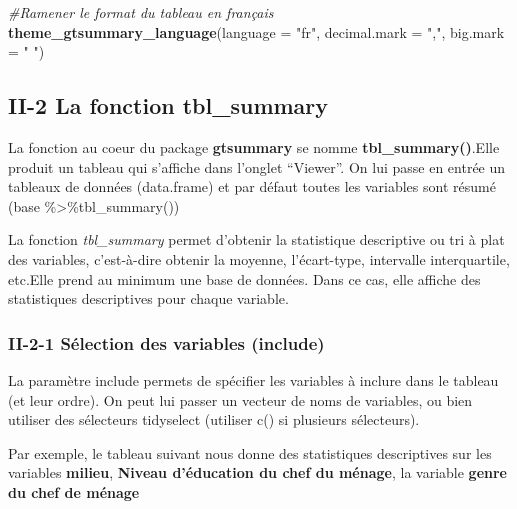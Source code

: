 \documentclass[
]{article}
\newenvironment{Shaded}{\begin{snugshade}}{\end{snugshade}}
\newcommand{\AttributeTok}[1]{\textcolor[rgb]{0.13,0.29,0.53}{#1}}
\newcommand{\CommentTok}[1]{\textcolor[rgb]{0.56,0.35,0.01}{\textit{#1}}}
\newcommand{\FunctionTok}[1]{\textcolor[rgb]{0.13,0.29,0.53}{\textbf{#1}}}
\newcommand{\NormalTok}[1]{#1}
\newcommand{\StringTok}[1]{\textcolor[rgb]{0.31,0.60,0.02}{#1}}
\begin{document}
\begin{Shaded}
\begin{Highlighting}[]
\CommentTok{\#Ramener le format du tableau en français }
\FunctionTok{theme\_gtsummary\_language}\NormalTok{(}\AttributeTok{language =} \StringTok{"fr"}\NormalTok{, }\AttributeTok{decimal.mark =} \StringTok{","}\NormalTok{,}
                         \AttributeTok{big.mark =} \StringTok{" "}\NormalTok{)}
\end{Highlighting}
\end{Shaded}

\hypertarget{ii-2-la-fonction-tbl_summary}{%
\subsection{II-2 La fonction
tbl\_summary}\label{ii-2-la-fonction-tbl_summary}}

La fonction au coeur du package \textbf{gtsummary} se nomme
\textbf{tbl\_summary()}.Elle produit un tableau qui s'affiche dans
l'onglet ``Viewer''. On lui passe en entrée un tableaux de données
(data.frame) et par défaut toutes les variables sont résumé (base
\%\textgreater\%tbl\_summary())

La fonction \emph{tbl\_summary} permet d'obtenir la statistique
descriptive ou tri à plat des variables, c'est-à-dire obtenir la
moyenne, l'écart-type, intervalle interquartile, etc.Elle prend au
minimum une base de données. Dans ce cas, elle affiche des statistiques
descriptives pour chaque variable.

\hypertarget{ii-2-1-suxe9lection-des-variables-include}{%
\subsubsection{II-2-1 Sélection des variables
(include)}\label{ii-2-1-suxe9lection-des-variables-include}}

La paramètre include permets de spécifier les variables à inclure dans
le tableau (et leur ordre). On peut lui passer un vecteur de noms de
variables, ou bien utiliser des sélecteurs tidyselect (utiliser c() si
plusieurs sélecteurs).

Par exemple, le tableau suivant nous donne des statistiques descriptives
sur les variables \textbf{milieu}, \textbf{Niveau d'éducation du chef du
ménage}, la variable \textbf{genre du chef de ménage}
\end{document}
